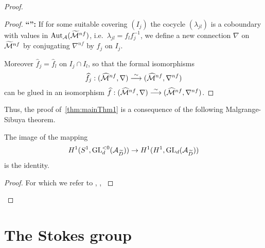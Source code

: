 \begin{proof}
\begin{proof}
    \textbf{``\Leftarrow{}'':}
    If for some suitable covering $(I_j)$ the cocycle $(\lambda_{jl})$ is a
    coboundary with values in $\operatorname{Aut}_\mathcal{A}(\widetilde{\mathcal{M}}^{nf})$, i.e.\
    $\lambda_{jl}=f_lf_j^{-1}$, we define a new connection $\nabla$ on
    $\widetilde{\mathcal{M}}^{nf}$ by conjugating $\nabla^{nf}$ by $f_j$ on $I_j$.

    \TODO{}

    Moreover $\hat f_j=\hat f_l$ on $I_j\cap I_l$, so that the formal
    isomorphisms
    \[
      \widehat f_j:(\widehat {\mathcal{M}}^{nf},\nabla)
      \overset{\sim}{\longrightarrow}
      (\widehat{\mathcal{M}}^{nf},\nabla^{nf})
    \]
    can be glued in an isomorphism $\widehat f:(\widehat {\mathcal{M}}^{nf},\nabla)
    \overset{\sim}{\longrightarrow}(\widehat{\mathcal{M}}^{nf},\nabla^{nf})$.
  \end{proof}

  Thus, the proof of~\ref{thm:mainThm1} is a consequence of the following
  Malgrange-Sibuya theorem.
  \begin{thm}
    The image of the mapping
    \[
      H^1(S^1,\operatorname{GL}_d^{<0}(\mathcal{A}_{\widetilde D}))
      \to
      H^1(H^1,\operatorname{GL}_d(\mathcal{A}_{\widetilde D}))
    \]
    is the identity.
  \end{thm}
  \begin{proof}
     For which we refer to
     \cite[Th.A.1]{Malgrange1983},
     \cite[Th.6.4.1]{sibuya1990Linear},
     \cite{babbitt1989local}
  \end{proof}
\end{proof}

\section{The Stokes group}
